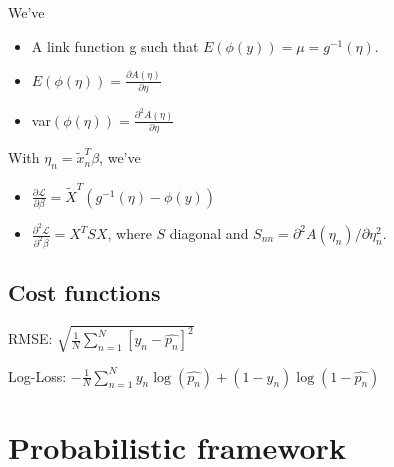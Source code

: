 \documentclass[10pt,a4paper,landscape]{article}
\renewcommand{\bf}[1]{\ensuremath{\mathbf{#1}}}
\newcommand{\bbeta}{\boldsymbol\beta}
\begin{document}
\begin{multicols*}{4}
We've
\begin{itemize}
  \item A link function g such that $E(\phi(y)) = \mu = g^{-1}(\eta)$.
  \item $E(\phi(\eta)) = \frac{\partial A(\eta)}{\partial\eta}$
  \item var$(\phi(\eta)) = \frac{\partial^2A(\eta)}{\partial\eta}$
\end{itemize}

With $\eta_n = \tilde{x}_n^T\beta$, we've
\begin{itemize}
	\item $\frac{\partial\mathcal{L}}{\partial\beta} = \tilde{X}^T(g^{-1}(\eta) - \phi(y))$
	\item $\frac{\partial^2\mathcal{L}}{\partial^2\beta} = X^TSX$, where $S$ diagonal and $S_{nn} = \partial^2A(\eta_n)/\partial\eta_n^2$.
\end{itemize}



\subsection{Cost functions}
RMSE: $\sqrt{\frac{1}{N} \sum_{n=1}^{N}\left[y_n- \hat{p_n} \right]^2}$


Log-Loss: $- \frac{1}{N}  \sum_{n=1}^{N} y_n \log(\hat{p_n}) + (1-y_n) \log(1-\hat{p_n})$

\section{Probabilistic framework}
%
%




\end{multicols*}
\end{document}
